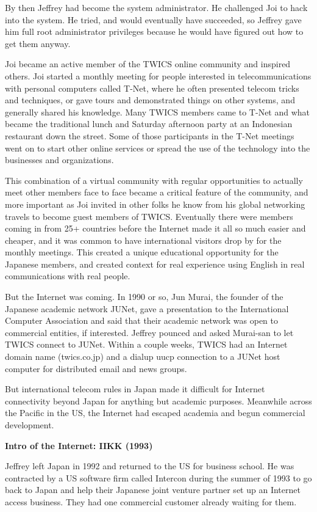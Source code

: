 By then Jeffrey had become the system administrator. He challenged Joi to hack into the system. He tried, and would eventually have succeeded, so Jeffrey gave him full root administrator privileges because he would have figured out how to get them anyway.

Joi became an active member of the TWICS online community and inspired others. Joi started a monthly meeting for people interested in telecommunications with personal computers called T-Net, where he often presented telecom tricks and techniques, or gave tours and demonstrated things on other systems, and generally shared his knowledge. Many TWICS members came to T-Net and what became the traditional lunch and Saturday afternoon party at an Indonesian restaurant down the street. Some of those participants in the T-Net meetings went on to start other online services or spread the use of the technology into the businesses and organizations.

This combination of a virtual community with regular opportunities to actually meet other members face to face became a critical feature of the community, and more important as Joi invited in other folks he know from his global networking travels to become guest members of TWICS. Eventually there were members coming in from 25+ countries before the Internet made it all so much easier and cheaper, and it was common to have international visitors drop by for the monthly meetings. This created a unique educational opportunity for the Japanese members, and created context for real experience using English in real communications with real people.

But the Internet was coming. In 1990 or so, Jun Murai, the founder of the Japanese academic network JUNet, gave a presentation to the International Computer Association and said that their academic network was open to commercial entities, if interested. Jeffrey pounced and asked Murai-san to let TWICS connect to JUNet. Within a couple weeks, TWICS had an Internet domain name (twics.co.jp) and a dialup uucp connection to a JUNet host computer for distributed email and news groups.

But international telecom rules in Japan made it difficult for Internet connectivity beyond Japan for anything but academic purposes. Meanwhile across the Pacific in the US, the Internet had escaped academia and begun commercial development.


\textbf{Intro of the Internet: IIKK (1993)}

Jeffrey left Japan in 1992 and returned to the US for business school. He was contracted by a US software firm called Intercon during the summer of 1993 to go back to Japan and help their Japanese joint venture partner set up an Internet access business. They had one commercial customer already waiting for them.

